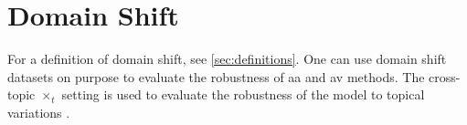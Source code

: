 \section{Domain Shift}
\label{sec:domain_shift}

For a definition of domain shift, see \autoref{sec:definitions}.
One can use domain shift datasets on purpose to evaluate the robustness of \ac{aa} and \ac{av} methods.
The cross-topic $\times_t$ setting is used to evaluate the robustness of the model to topical variations \cite{tyo_state_2022}.